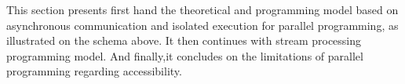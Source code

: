 This section presents first hand the theoretical and programming model based on asynchronous communication and isolated execution for parallel programming, as illustrated on the schema above.
It then continues with stream processing programming model. 
And finally,it concludes on the limitations of parallel programming regarding accessibility. 














